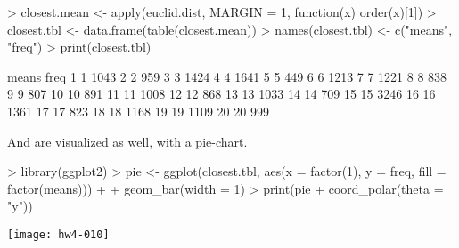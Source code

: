\documentclass{article}
\begin{document}
\begin{enumerate}[(a)]
\begin{Schunk}
\begin{Sinput}
> closest.mean <- apply(euclid.dist, MARGIN = 1, function(x) order(x)[1])
> closest.tbl <- data.frame(table(closest.mean))
> names(closest.tbl) <- c("means", "freq")
> print(closest.tbl)
\end{Sinput}
\begin{Soutput}
   means freq
1      1 1043
2      2  959
3      3 1424
4      4 1641
5      5  449
6      6 1213
7      7 1221
8      8  838
9      9  807
10    10  891
11    11 1008
12    12  868
13    13 1033
14    14  709
15    15 3246
16    16 1361
17    17  823
18    18 1168
19    19 1109
20    20  999
\end{Soutput}
\end{Schunk}

    And are visualized as well, with a pie-chart.
\begin{Schunk}
\begin{Sinput}
> library(ggplot2)
> pie <- ggplot(closest.tbl, aes(x = factor(1), y = freq, fill = factor(means))) + 
+     geom_bar(width = 1)
> print(pie + coord_polar(theta = "y"))
\end{Sinput}
\end{Schunk}
\texttt{[image: hw4-010]}
    \end{enumerate}
\end{document}
